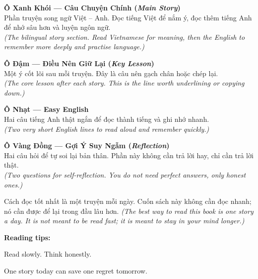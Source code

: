 \begin{tcolorbox}[
  colback=agedgold!8,
  colframe=agedgold!70!black,
  coltitle=black,
  fonttitle=\bfseries,
  title={Giải Thích Các Ô Màu Trong Sách \quad\textit{(Color-Box Guide)}},
  arc=4pt, boxrule=1pt, breakable, enhanced
]
\smallskip
\textbf{\color{inkdark}Ô Xanh Khói --- Câu Chuyện Chính (\textit{Main Story})}\\
Phần truyện song ngữ Việt -- Anh. Đọc tiếng Việt để nắm ý, đọc thêm tiếng Anh để nhớ sâu hơn và luyện ngôn ngữ.\\
\textit{(The bilingual story section. Read Vietnamese for meaning, then the English to remember more deeply and practise language.)}

\medskip
\textbf{\color{smokeblue}Ô Đậm --- Điều Nên Giữ Lại (\textit{Key Lesson})}\\
Một ý cốt lõi sau mỗi truyện. Đây là câu nên gạch chân hoặc chép lại.\\
\textit{(The core lesson after each story. This is the line worth underlining or copying down.)}

\medskip
\textbf{\color{smokeblue!60}Ô Nhạt --- Easy English}\\
Hai câu tiếng Anh thật ngắn để đọc thành tiếng và ghi nhớ nhanh.\\
\textit{(Two very short English lines to read aloud and remember quickly.)}

\medskip
\textbf{\color{agedgold!80!black}Ô Vàng Đồng --- Gợi Ý Suy Ngẫm (\textit{Reflection})}\\
Hai câu hỏi để tự soi lại bản thân. Phần này không cần trả lời hay, chỉ cần trả lời thật.\\
\textit{(Two questions for self-reflection. You do not need perfect answers, only honest ones.)}
\smallskip
\end{tcolorbox}

\begin{baihoc}
Cách đọc tốt nhất là một truyện mỗi ngày. Cuốn sách này không cần đọc nhanh; nó cần được để lại trong đầu lâu hơn.
\textit{(The best way to read this book is one story a day. It is not meant to be read fast; it is meant to stay in your mind longer.)}
\end{baihoc}

\begin{ghinhoanh}
\textbf{Reading tips:}

Read slowly. Think honestly.

One story today can save one regret tomorrow.
\end{ghinhoanh}

\ngancach